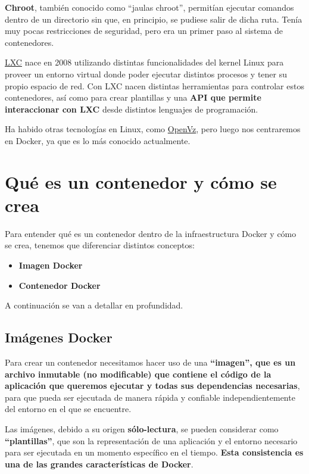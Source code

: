 \textbf{Chroot}, también conocido como “jaulas chroot”, permitían ejecutar comandos dentro de un directorio sin que, en principio, se pudiese salir de dicha ruta. Tenía muy pocas restricciones de seguridad, pero era un primer paso al sistema de contenedores.

\href{https://es.wikipedia.org/wiki/LXC}{LXC} nace en 2008 utilizando distintas funcionalidades del kernel Linux para proveer un entorno virtual donde poder ejecutar distintos procesos y tener su propio espacio de red. Con LXC nacen distintas herramientas para controlar estos contenedores, así como para crear plantillas y una \textbf{API que permite interaccionar con LXC} desde distintos lenguajes de programación.

Ha habido otras tecnologías en Linux, como \href{https://es.wikipedia.org/wiki/OpenVZ}{OpenVz}, pero luego nos centraremos en Docker, ya que es lo más conocido actualmente.


\section{Qué es un contenedor y cómo se crea}

Para entender qué es un contenedor dentro de la infraestructura Docker y cómo se crea, tenemos que diferenciar distintos conceptos:
\begin{itemize}
    \item \textbf{Imagen Docker}
    \item \textbf{Contenedor Docker}
\end{itemize}

A continuación se van a detallar en profundidad.

\subsection{Imágenes Docker}

Para crear un contenedor necesitamos hacer uso de una \textbf{“imagen”, que es un archivo inmutable (no modificable) que contiene el código de la aplicación que queremos ejecutar y todas sus dependencias necesarias}, para que pueda ser ejecutada de manera rápida y confiable independientemente del entorno en el que se encuentre.

Las imágenes, debido a su origen \textbf{sólo-lectura}, se pueden considerar como \textbf{“plantillas”}, que son la representación de una aplicación y el entorno necesario para ser ejecutada en un momento específico en el tiempo. \textbf{Esta consistencia es una de las grandes características de Docker}.

